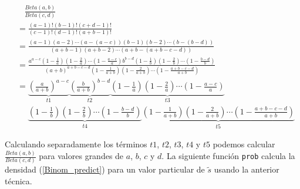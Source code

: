 \documentclass[10pt,openright]{book}\usepackage[]{graphicx}\usepackage[]{color}
\begin{document}
    \begin{align*}
    &\ \ \ \ \frac{Beta(a,b)}{Beta(c,d)}\\
    &=\frac{(a-1)!(b-1)!(c+d-1)!}{(c-1)!(d-1)!(a+b-1)!}\\
    &=\frac{(a-1)(a-2)\cdots(a-(a-c))(b-1)(b-2)\cdots(b-(b-d))}{(a+b-1)(a+b-2)\cdots(a+b-(a+b-c-d))}\\
    &=\frac{a^{a-c}(1-\frac{1}{a})(1-\frac{2}{a})\cdots(1-\frac{a-c}{a})b^{b-d}(1-\frac{1}{b})(1-\frac{2}{b})\cdots(1-\frac{b-d}{b})}{(a+b)^{a+b-c-d}(1-\frac{1}{a+b})(1-\frac{2}{a+b})\cdots(1-\frac{a+b-c-d}{a+b})}\\
    &=\underbrace{\left(\frac{a}{a+b}\right)^{a-c}}_{t1}\underbrace{\left(\frac{b}{a+b}\right)^{b-d}}_{t2}\underbrace{(1-\frac{1}{a})(1-\frac{2}{a})\cdots(1-\frac{a-c}{a})}_{t3}\\
    &\ \ \ \ \ \ \underbrace{(1-\frac{1}{b})(1-\frac{2}{b})\cdots(1-\frac{b-d}{b})}_{t4}\underbrace{(1-\frac{1}{a+b})(1-\frac{2}{a+b})\cdots(1-\frac{a+b-c-d}{a+b})}_{t5}
    \end{align*}
    
    Calculando separadamente los t\'erminos $t1$, $t2$, $t3$, $t4$ y $t5$ podemos calcular $\frac{Beta(a,b)}{Beta(c,d)}$ para valores grandes de $a$, $b$, $c$ y $d$. La siguiente funci\'on \verb"prob" calcula la densidad (\ref{Binom_predict}) para un valor particular de $\tilde{s}$ usando la anterior t\'ecnica.
    
\end{document}
